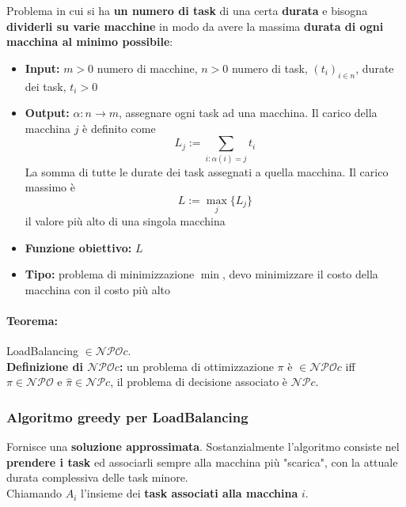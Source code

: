 \documentclass[11pt]{article}
\begin{document}
	Problema in cui si ha \textbf{un numero di task} di una certa \textbf{durata} e bisogna \textbf{dividerli su varie macchine} in modo da avere la massima \textbf{durata di ogni macchina al minimo possibile}:
	\begin{itemize}
		\item \textbf{Input:} $m > 0$ numero di macchine, $n>0$ numero di task, $(t_i)_{i \in n}$, durate dei task, $t_i > 0$
		
		\item \textbf{Output:} $\alpha: n \rightarrow m$, assegnare ogni task ad una macchina. Il carico della macchina $j$ è definito come 
		$$ L_j := \sum_{i: \alpha (i) = j} t_i$$
		La somma di tutte le durate dei task assegnati a quella macchina. Il carico massimo è
		$$ L := \max_j \{L_j\}$$ 
		il valore più alto di una singola macchina
		
		\item \textbf{Funzione obiettivo:} $L$
		
		\item \textbf{Tipo:} problema di minimizzazione $\min$, devo minimizzare il costo della macchina con il costo più alto
	\end{itemize}
	
	\paragraph{Teorema:} LoadBalancing $\in \mathcal{NPO}c$.\\
	
	\textbf{Definizione di $\mathcal{NPO}c$:} un problema di ottimizzazione $\pi$ è $\in \mathcal{NPO}c$ iff $\pi \in \mathcal{NPO}$ e $\hat{\pi} \in \mathcal{NP}c$, il problema di decisione associato è $\mathcal{NP}c$.\\
	
	\newpage
	
	\subsubsection{Algoritmo greedy per LoadBalancing}
	
	Fornisce una \textbf{soluzione approssimata}. Sostanzialmente l'algoritmo consiste nel \textbf{prendere i task} ed associarli sempre alla macchina più "scarica", con la attuale durata complessiva delle task minore.\\
	
	Chiamando $A_i$ l'insieme dei \textbf{task associati alla macchina} $i$.\\
	
\end{document}
